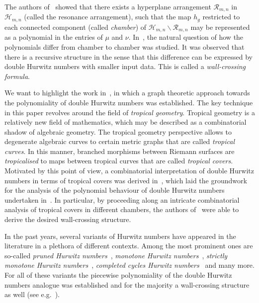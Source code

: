 \documentclass[ALCO,published]{cedram}
\begin{document}
The authors of~\cite{GJV05} showed that there exists a hyperplane arrangement $\mathcal{R}_{m,n}$ in $\mathcal{H}_{m,n}$ (called the resonance arrangement), such that the map $h_g$ restricted to each connected component (called \textit{chamber}) of $\mathcal{H}_{m,n}\backslash\mathcal{R}_{m,n}$ may be represented as a polynomial in the entries of $\mu$ and $\nu$. In~\cite{SSV08, CJM11, Joh15}, the natural question of how the polynomials differ from chamber to chamber was studied. It was observed that there is a recursive structure in the sense that this difference can be expressed by double Hurwitz numbers with smaller input data. This is called a \textit{wall-crossing formula}.

We want to highlight the work in~\cite{CJM11}, in which a graph theoretic approach towards the polynomiality of double Hurwitz numbers was established. The key technique in this paper revolves around the field of \textit{tropical geometry}. Tropical geometry is a relatively new field of mathematics, which may be described as a combinatorial shadow of algebraic geometry. The tropical geometry perspective allows to degenerate algebraic curves to certain metric graphs that are called \textit{tropical curves}. In this manner, branched morphisms between Riemann surfaces are \textit{tropicalised} to maps between tropical curves that are called \textit{tropical covers}. Motivated by this point of view, a combinatorial interpretation of double Hurwitz numbers in terms of tropical covers was derived in~\cite{CJM10}, which laid the groundwork for the analysis of the polynomial behaviour of double Hurwitz numbers undertaken in~\cite{CJM11}. In particular, by proceeding along an intricate combinatorial analysis of tropical covers in different chambers, the authors of~\cite{CJM11} were able to derive the desired wall-crossing structure.

In the past years, several variants of Hurwitz numbers have appeared in the literature in a plethora of different contexts. Among the most prominent ones are so-called \textit{pruned Hurwitz numbers}~\cite{do2018pruned,hahn2020bi}, \textit{monotone Hurwitz numbers}~\cite{goulden2014monotone}, \textit{strictly monotone Hurwitz numbers}~\cite{kazarian2015virasoro}, \textit{completed cycles Hurwitz numbers}~\cite{okounkov2006gromov} and many more. For all of these variants the piecewise polynomiality of the double Hurwitz numbers analogue was established and for the majority a wall-crossing structure as well (see e.g.~\cite{zbMATH06791415, hahn2018wall,hahn2020wall,shadrin2012double}).
\end{document}
